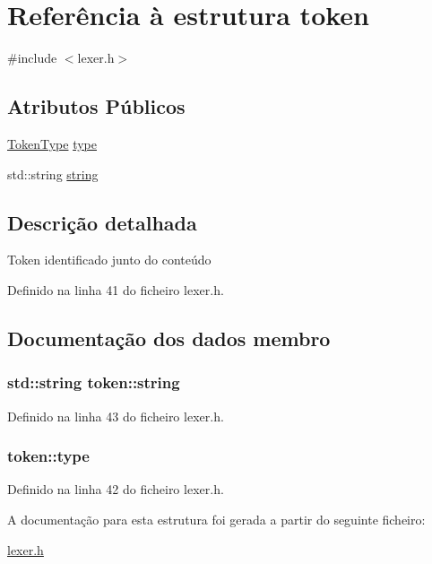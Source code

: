 \hypertarget{structtoken}{\section{Referência à estrutura token}
\label{structtoken}
}


{\ttfamily \#include $<$lexer.\-h$>$}

\subsection*{Atributos Públicos}
\begin{DoxyCompactItemize}
\item 
\hyperlink{lexer_8h_aa520fbf142ba1e7e659590c07da31921}{Token\-Type} \hyperlink{structtoken_a0ccfb094c0dce37e1bae7d990c06cc92}{type}
\item 
std\-::string \hyperlink{structtoken_a2150b4d92215b15d0c62c40cafd407ba}{string}
\end{DoxyCompactItemize}


\subsection{Descrição detalhada}
Token identificado junto do conteúdo 

Definido na linha 41 do ficheiro lexer.\-h.



\subsection{Documentação dos dados membro}
\hypertarget{structtoken_a2150b4d92215b15d0c62c40cafd407ba}{
\subsubsection[{string}]{\setlength{\rightskip}{0pt plus 5cm}std\-::string token\-::string}}\label{structtoken_a2150b4d92215b15d0c62c40cafd407ba}


Definido na linha 43 do ficheiro lexer.\-h.

\hypertarget{structtoken_a0ccfb094c0dce37e1bae7d990c06cc92}{
\subsubsection[{type}]{ token\-::type}}\label{structtoken_a0ccfb094c0dce37e1bae7d990c06cc92}


Definido na linha 42 do ficheiro lexer.\-h.



A documentação para esta estrutura foi gerada a partir do seguinte ficheiro\-:\begin{DoxyCompactItemize}
\item 
\hyperlink{lexer_8h}{lexer.\-h}\end{DoxyCompactItemize}
